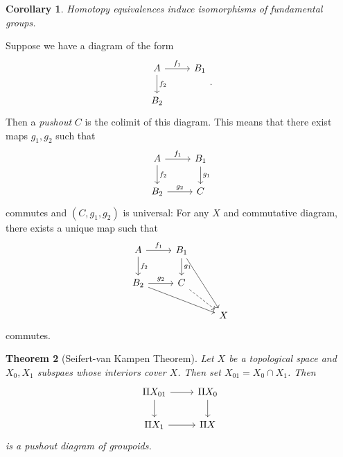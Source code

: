 \documentclass[leqno, openany]{memoir}
\newtheorem{thm}{Theorem}[section]
\newtheorem{cor}[thm]{Corollary}
\theoremstyle{definition}
\theoremstyle{remark}
\theoremstyle{plain}
\theoremstyle{definition}
\theoremstyle{remark}
\begin{document}
\begin{cor}
    Homotopy equivalences induce isomorphisms of fundamental groups.
\end{cor}

Suppose we have a diagram of the form
\begin{equation}
\begin{tikzcd}
    A \arrow{r}{f_1} \arrow{d}{f_2} & B_1 \\
    B_2
\end{tikzcd}.
\end{equation}
Then a \textit{pushout} $C$ is the colimit of this diagram. This means that there exist maps $g_1, g_2$ such that
\begin{equation}
\begin{tikzcd}
    A \arrow{r}{f_1} \arrow{d}{f_2} & B_1 \arrow{d}{g_1} \\
    B_2 \arrow{r}{g_2} & C
\end{tikzcd}
\end{equation}
commutes and $(C, g_1, g_2)$ is universal: For any $X$ and commutative diagram, there exists a unique map such that
\begin{equation}
\begin{tikzcd}
    A \arrow{r}{f_1} \arrow{d}{f_2} & B_1 \arrow{d}{g_1} \arrow{ddr} & \\
    B_2 \arrow{r}{g_2} \arrow{drr} & C \arrow[dashrightarrow]{dr} &  \\
                                   & & X
\end{tikzcd}
\end{equation}
commutes.

\begin{thm}[Seifert-van Kampen Theorem]
    Let $X$ be a topological space and $X_0, X_1$ subspaes whose interiors cover $X$. Then set $X_{01} = X_0 \cap X_1$. Then 
\begin{equation}
\begin{tikzcd}
    \Pi X_{01} \arrow{r} \arrow{d} & \Pi X_0 \arrow{d} \\
    \Pi X_1 \arrow{r} & \Pi X
\end{tikzcd}
\end{equation}
is a pushout diagram of groupoids.
\end{thm}
\end{document}
